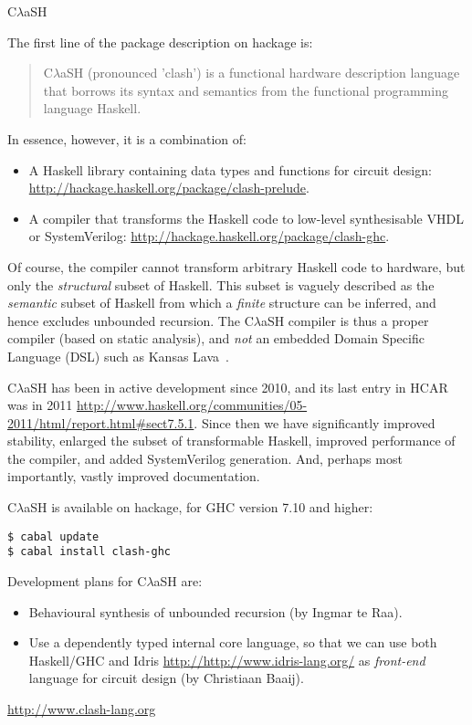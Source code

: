 \documentclass[DIV16,twocolumn,10pt]{scrreprt}
\begin{document}
\begin{hcarentry}{\texorpdfstring{C$\lambda$aSH}{CLaSH}}
\makeheader

The first line of the package description on hackage is:
\begin{quote}
C$\lambda$aSH (pronounced 'clash') is a functional hardware description language that borrows its syntax and semantics from the functional programming language Haskell.
\end{quote}

In essence, however, it is a combination of:
\begin{itemize}
  \item A Haskell library containing data types and functions for circuit design: \url{http://hackage.haskell.org/package/clash-prelude}.
  \item A compiler that transforms the Haskell code to low-level synthesisable VHDL or SystemVerilog: \url{http://hackage.haskell.org/package/clash-ghc}.
\end{itemize}
Of course, the compiler cannot transform arbitrary Haskell code to hardware, but only the \emph{structural} subset of Haskell.
This subset is vaguely described as the \emph{semantic} subset of Haskell from which a \emph{finite} structure can be inferred, and hence excludes unbounded recursion.
The C$\lambda$aSH compiler is thus a proper compiler (based on static analysis), and \emph{not} an embedded Domain Specific Language (DSL) such as Kansas Lava~\cite{klava}.

C$\lambda$aSH has been in active development since 2010, and its last entry in HCAR was in 2011 \url{http://www.haskell.org/communities/05-2011/html/report.html#sect7.5.1}.
Since then we have significantly improved stability, enlarged the subset of transformable Haskell, improved performance of the compiler, and added SystemVerilog generation.
And, perhaps most importantly, vastly improved documentation.

C$\lambda$aSH is available on hackage, for GHC version 7.10 and higher:
\begin{verbatim}
$ cabal update
$ cabal install clash-ghc
\end{verbatim}

Development plans for C$\lambda$aSH are:
\begin{itemize}
  \item Behavioural synthesis of unbounded recursion (by Ingmar te Raa).
  \item Use a dependently typed internal core language, so that we can use both Haskell/GHC and Idris \url{http://http://www.idris-lang.org/} as \emph{front-end} language for circuit design (by Christiaan Baaij).
\end{itemize}

\FurtherReading
  \url{http://www.clash-lang.org}
\end{hcarentry}
\end{document}
